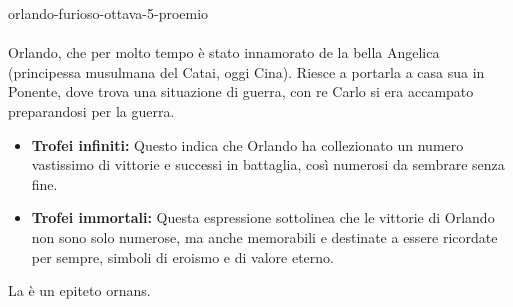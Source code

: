 \documentclass[preview]{standalone}
\begin{document}
\begin{snippet}{orlando-furioso-ottava-5-proemio}
    \\\\
    Orlando, che per molto tempo è stato innamorato de la bella Angelica (principessa musulmana del Catai, oggi Cina).
    Riesce a portarla a casa sua in Ponente, dove trova una situazione di guerra,
    con re Carlo si era accampato preparandosi per la guerra.
    \begin{itemize}
        \item \textbf{Trofei infiniti:} Questo indica che Orlando ha collezionato un
            numero vastissimo di vittorie e successi in battaglia,
            così numerosi da sembrare senza fine.
        \item \textbf{Trofei immortali:} Questa espressione sottolinea che le
            vittorie di Orlando non sono solo numerose, ma anche
            memorabili e destinate a essere ricordate per sempre,
            simboli di eroismo e di valore eterno.
    \end{itemize}
    La  è un epiteto ornans.
\end{snippet}
\end{document}
